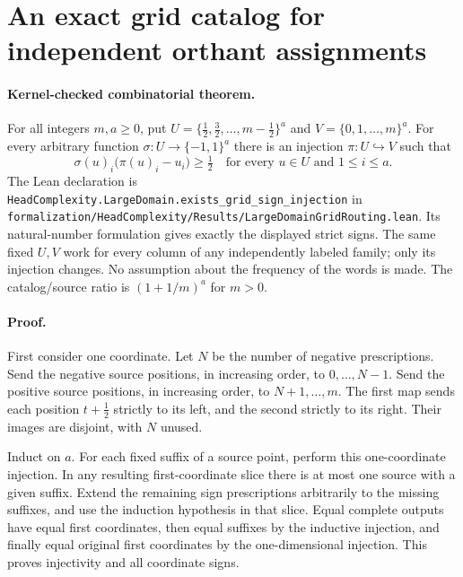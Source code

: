 \documentclass{article}
\begin{document}
\section*{An exact grid catalog for independent orthant assignments}

\paragraph{Kernel-checked combinatorial theorem.}
For all integers $m,a\geq0$, put
$U=\{\tfrac12,\tfrac32,\ldots,m-\tfrac12\}^a$ and
$V=\{0,1,\ldots,m\}^a$.
For every arbitrary function $\sigma:U\to\{-1,1\}^a$ there is an injection
$\pi:U\hookrightarrow V$ such that
\[
 \sigma(u)_i\bigl(\pi(u)_i-u_i\bigr)\geq\tfrac12
 \quad\text{for every }u\in U\text{ and }1\leq i\leq a.
\]
The Lean declaration is
\texttt{HeadComplexity.LargeDomain.exists\_grid\_sign\_injection} in
\texttt{formalization/HeadComplexity/Results/LargeDomainGridRouting.lean}.
Its natural-number formulation gives exactly the displayed strict signs.
The same fixed $U,V$ work for every column of any independently labeled family;
only its injection changes. No assumption about the frequency of the words is
made. The catalog/source ratio is $(1+1/m)^a$ for $m>0$.

\paragraph{Proof.}
First consider one coordinate. Let $N$ be the number of negative prescriptions.
Send the negative source positions, in increasing order, to $0,\ldots,N-1$.
Send the positive source positions, in increasing order, to $N+1,\ldots,m$.
The first map sends each position $t+\tfrac12$ strictly to its left, and the
second strictly to its right. Their images are disjoint, with $N$ unused.

Induct on $a$. For each fixed suffix of a source point, perform this
one-coordinate injection. In any resulting first-coordinate slice there is
at most one source with a given suffix. Extend the remaining sign prescriptions
arbitrarily to the missing suffixes, and use the induction hypothesis in that
slice. Equal complete outputs have equal first coordinates, then equal suffixes
by the inductive injection, and finally equal original first coordinates by
the one-dimensional injection. This proves injectivity and all coordinate signs.
\end{document}
